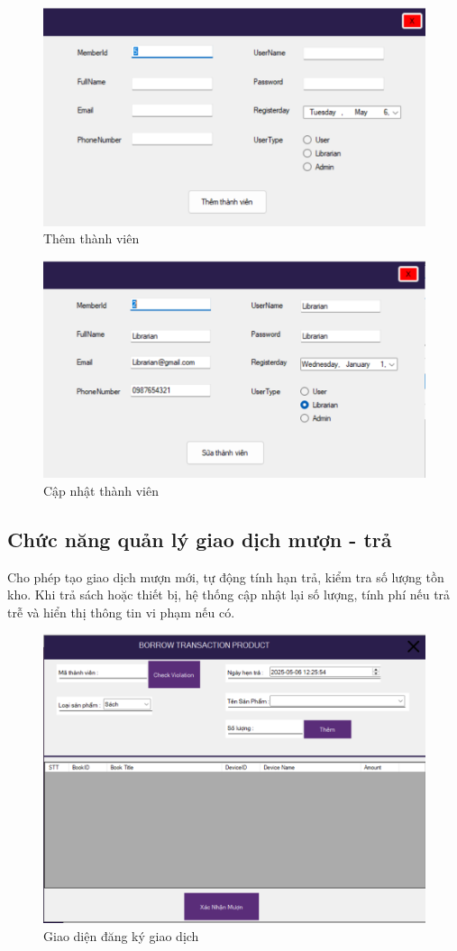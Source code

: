 \documentclass{article}
\begin{document}
\begin{figure} [H]
    \centering
    \includegraphics[width=0.8\linewidth]{images//Winform/cn ql tv2.png}
    \caption{Thêm thành viên}
    \label{fig:enter-label}
\end{figure}

\begin{figure} [H]
    \centering
    \includegraphics[width=0.8\linewidth]{images//Winform/cn ql tv3.png}
    \caption{Cập nhật thành viên}
    \label{fig:enter-label}
\end{figure}

\newpage
\subsection{Chức năng quản lý giao dịch mượn - trả}
Cho phép tạo giao dịch mượn mới, tự động tính hạn trả, kiểm tra số lượng tồn kho. Khi trả sách hoặc thiết bị, hệ thống cập nhật lại số lượng, tính phí nếu trả trễ và hiển thị thông tin vi phạm nếu có.

\begin{figure} [H]
    \centering
    \includegraphics[width=0.8\linewidth]{images//Winform/cn ql gd1.png}
    \caption{Giao diện đăng ký giao dịch}
    \label{fig:enter-label}
\end{figure}
\end{document}
